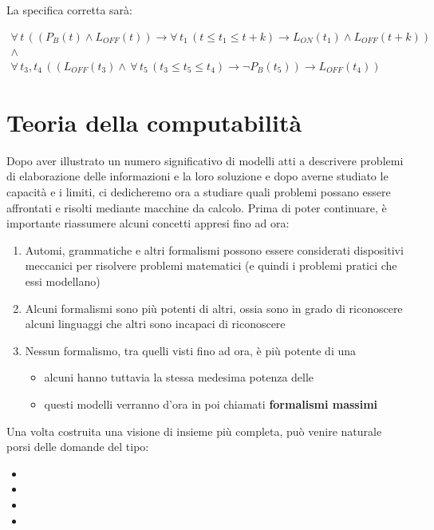 \documentclass[italian, 10pt]{article}
\begin{document}
La specifica corretta sarà:

\begin{gather*}
  \forall \, t \, ((P_B(t) \land L_{OFF}(t)) \rightarrow \forall \, t_1 \, (t \leq t_1 \leq t + k) \rightarrow L_{ON}(t_1) \land L_{OFF}(t+k)) \\ \land \\
  \forall \, t_3, t_4 \, ((L_{OFF}(t_3) \land \, \forall \, t_5 \, (t_3 \leq t_5 \leq t_4) \rightarrow \lnot P_B(t_5)) \rightarrow L_{OFF}(t_4))
\end{gather*}

\clearpage

\section{Teoria della computabilità}

Dopo aver illustrato un numero significativo di modelli atti a descrivere problemi di elaborazione delle informazioni e la loro soluzione e dopo averne studiato le capacità e i limiti, ci dedicheremo ora a studiare quali problemi possano essere affrontati e risolti mediante macchine da calcolo.
Prima di poter continuare, è importante riassumere alcuni concetti appresi fino ad ora:

\begin{enumerate}
  \item Automi, grammatiche e altri formalismi possono essere considerati dispositivi meccanici per risolvere problemi matematici (e quindi i problemi pratici che essi modellano)
  \item Alcuni formalismi sono più potenti di altri, ossia sono in grado di riconoscere alcuni linguaggi che altri sono incapaci di riconoscere
  \item Nessun formalismo, tra quelli visti fino ad ora, è più potente di una \TM
        \begin{itemize}[label=\(\rightarrow\)]
          \item alcuni hanno tuttavia la stessa medesima potenza delle \TM
          \item questi modelli verranno d'ora in poi chiamati \textbf{formalismi massimi}
        \end{itemize}
\end{enumerate}

Una volta costruita una visione di insieme più completa, può venire naturale porsi delle domande del tipo:

\begin{itemize}
  \item {}
  \item {}
  \item {}
  \item {}
\end{itemize}
\end{document}
